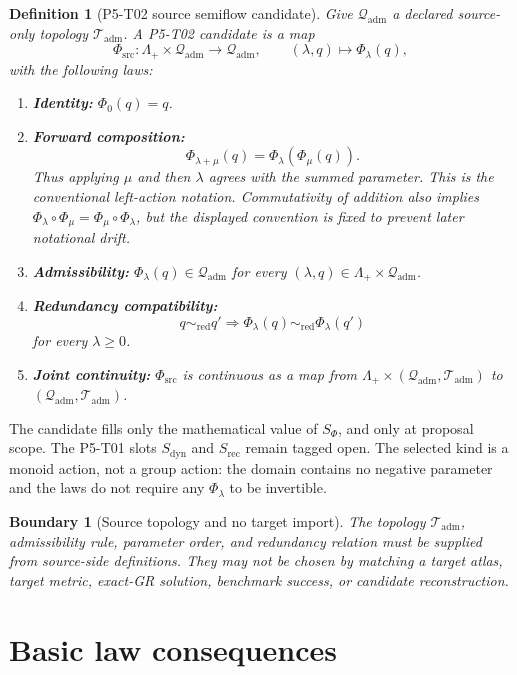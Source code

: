 \documentclass[11pt]{article}
\newcommand{\Qadm}{\mathcal Q_{\mathrm{adm}}}
\newcommand{\PhiSrc}{\Phi_{\mathrm{src}}}
\newcommand{\Lam}{\Lambda_+}
\newtheorem{definition}{Definition}
\newtheorem{boundary}{Boundary}
\begin{document}
\begin{definition}[P5-T02 source semiflow candidate]
Give \(\Qadm\) a declared source-only topology \(\mathcal T_{\mathrm{adm}}\).
A P5-T02 candidate is a map
\[
  \PhiSrc:\Lam\times\Qadm\longrightarrow\Qadm,
  \qquad (\lambda,q)\longmapsto\Phi_\lambda(q),
\]
with the following laws:
\begin{enumerate}[label=(S\arabic*)]
  \item \textbf{Identity:} \(\Phi_0(q)=q\).
  \item \textbf{Forward composition:}
  \[
    \Phi_{\lambda+\mu}(q)
    =\Phi_\lambda(\Phi_\mu(q)).
  \]
  Thus applying \(\mu\) and then \(\lambda\) agrees with the summed
  parameter. This is the conventional left-action notation. Commutativity of
  addition also implies
  \(\Phi_\lambda\circ\Phi_\mu=\Phi_\mu\circ\Phi_\lambda\), but the displayed
  convention is fixed to prevent later notational drift.
  \item \textbf{Admissibility:}
  \(\Phi_\lambda(q)\in\Qadm\) for every
  \((\lambda,q)\in\Lam\times\Qadm\).
  \item \textbf{Redundancy compatibility:}
  \[
    q\sim_{\mathrm{red}}q'
    \Longrightarrow
    \Phi_\lambda(q)\sim_{\mathrm{red}}\Phi_\lambda(q')
  \]
  for every \(\lambda\geq0\).
  \item \textbf{Joint continuity:} \(\PhiSrc\) is continuous as a map from
  \(\Lam\times(\Qadm,\mathcal T_{\mathrm{adm}})\) to
  \((\Qadm,\mathcal T_{\mathrm{adm}})\).
\end{enumerate}
\end{definition}

The candidate fills only the mathematical value of \(S_\Phi\), and only at
proposal scope. The P5-T01 slots \(S_{\mathrm{dyn}}\) and
\(S_{\mathrm{rec}}\) remain tagged open. The selected kind is a monoid action,
not a group action: the domain contains no negative parameter and the laws do
not require any \(\Phi_\lambda\) to be invertible.

\begin{boundary}[Source topology and no target import]
The topology \(\mathcal T_{\mathrm{adm}}\), admissibility rule, parameter
order, and redundancy relation must be supplied from source-side definitions.
They may not be chosen by matching a target atlas, target metric, exact-GR
solution, benchmark success, or candidate reconstruction.
\end{boundary}

\section{Basic law consequences}
\end{document}
